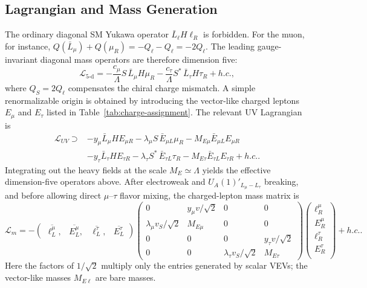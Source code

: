 \documentclass[onecolumn, aps, nofootinbib, prd, preprint, floats, floatfix, amsmath, amssymb, superscriptaddress, preprintnumbers]{revtex4-1}
\begin{document}
\subsection{Lagrangian and Mass Generation}

The ordinary diagonal SM Yukawa operator \(\bar L_\ell H\ell_R\) is forbidden. For the muon, for instance, \(Q(\bar L_\mu)+Q(\mu_R)=-Q_\ell-Q_\ell=-2Q_\ell\). The leading gauge-invariant diagonal mass operators are therefore dimension five:
\begin{equation}
    \mathcal{L}_{\text{5-d}} =
    -\frac{c_\mu}{\Lambda} S\,\bar{L}_\mu H\mu_R
    -\frac{c_\tau}{\Lambda} S^*\,\bar{L}_\tau H\tau_R
    +h.c.,
\end{equation}
where \(Q_S=2Q_\ell\) compensates the chiral charge mismatch. A simple renormalizable origin is obtained by introducing the vector-like charged leptons \(E_\mu\) and \(E_\tau\) listed in Table~\ref{tab:charge-assignment}. The relevant UV Lagrangian is
\begin{equation}
\begin{aligned}
\mathcal{L}_{UV}\supset&
-y_\mu \bar L_\mu H E_{\mu R}
-\lambda_\mu S\,\bar E_{\mu L}\mu_R
-M_{E\mu}\bar E_{\mu L}E_{\mu R}\\
&
-y_\tau \bar L_\tau H E_{\tau R}
-\lambda_\tau S^*\,\bar E_{\tau L}\tau_R
-M_{E\tau}\bar E_{\tau L}E_{\tau R}
+h.c. .
\end{aligned}
\end{equation}
Integrating out the heavy fields at the scale \(M_E\simeq\Lambda\) yields the effective dimension-five operators above. After electroweak and \(U_A(1)'_{L_\mu-L_\tau}\) breaking, and before allowing direct \(\mu\)--\(\tau\) flavor mixing, the charged-lepton mass matrix is
\begin{equation}
\mathcal{L}_m=-
\begin{pmatrix}
	\overline{\ell^{\mu}_L},  &
	\overline{E^\mu_L}, &
	\overline{\ell^\tau_L}, &
	\overline{E^\tau_L}
\end{pmatrix}
\begin{pmatrix}
	0 & y_{\mu}v/\sqrt2  & 0 & 0 \\
	\lambda_\mu v_S/\sqrt2 & M_{E\mu} & 0 & 0\\
	0 & 0 & 0 & y_{\tau}v/\sqrt2\\
    0 & 0 &  \lambda_\tau v_S/\sqrt2 & M_{E\tau}
\end{pmatrix}
\begin{pmatrix}
	\ell^{\mu}_R \\
	E^\mu_R \\
	  \ell^\tau_R \\
	  E^\tau_R \\
\end{pmatrix}
+h.c. .
\label{eq:4by4-mass-no-mutau}
\end{equation}
Here the factors of $1/\sqrt2$ multiply only the entries generated by scalar VEVs; the vector-like masses $M_{E\ell}$ are bare masses.
\end{document}
